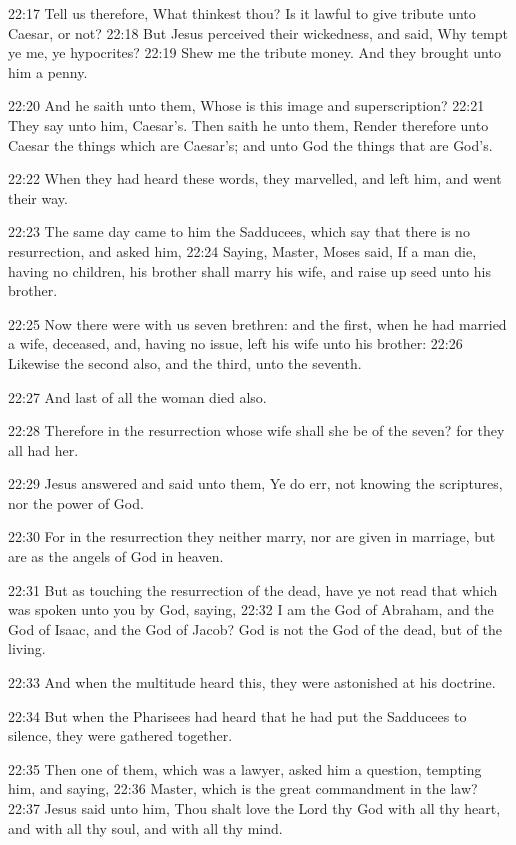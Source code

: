 22:17 Tell us therefore, What thinkest thou? Is it lawful to give tribute unto Caesar, or not?  22:18 But Jesus perceived their wickedness, and said, Why tempt ye me, ye hypocrites?  22:19 Shew me the tribute money. And they brought unto him a penny.

22:20 And he saith unto them, Whose is this image and superscription?  22:21 They say unto him, Caesar's. Then saith he unto them, Render therefore unto Caesar the things which are Caesar's; and unto God the things that are God's.

22:22 When they had heard these words, they marvelled, and left him, and went their way.

22:23 The same day came to him the Sadducees, which say that there is no resurrection, and asked him, 22:24 Saying, Master, Moses said, If a man die, having no children, his brother shall marry his wife, and raise up seed unto his brother.

22:25 Now there were with us seven brethren: and the first, when he had married a wife, deceased, and, having no issue, left his wife unto his brother: 22:26 Likewise the second also, and the third, unto the seventh.

22:27 And last of all the woman died also.

22:28 Therefore in the resurrection whose wife shall she be of the seven?  for they all had her.

22:29 Jesus answered and said unto them, Ye do err, not knowing the scriptures, nor the power of God.

22:30 For in the resurrection they neither marry, nor are given in marriage, but are as the angels of God in heaven.

22:31 But as touching the resurrection of the dead, have ye not read that which was spoken unto you by God, saying, 22:32 I am the God of Abraham, and the God of Isaac, and the God of Jacob?  God is not the God of the dead, but of the living.

22:33 And when the multitude heard this, they were astonished at his doctrine.

22:34 But when the Pharisees had heard that he had put the Sadducees to silence, they were gathered together.

22:35 Then one of them, which was a lawyer, asked him a question, tempting him, and saying, 22:36 Master, which is the great commandment in the law?  22:37 Jesus said unto him, Thou shalt love the Lord thy God with all thy heart, and with all thy soul, and with all thy mind.


